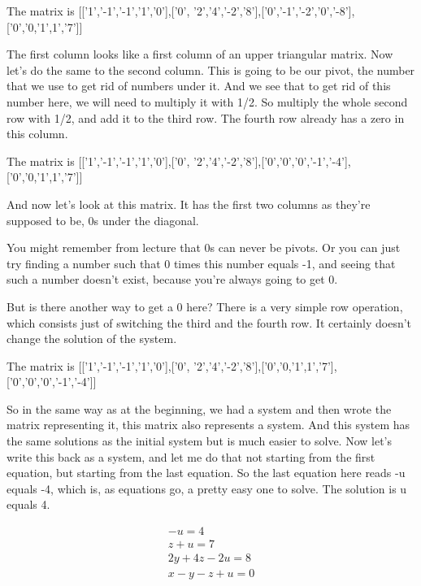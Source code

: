 \documentclass{ximera}
\begin{document}
\begin{question}
\begin{solution}
\begin{hint}
\begin{matrixAnswer}[name=M]
      The matrix is  [['1','-1','-1','1','0'],['0', '2','4','-2','8'],['0','-1','-2','0','-8'],['0','0,'1',1','7']]
 \end{matrixAnswer}
\end{hint}
\begin{hint}
The first column looks like a first column of an upper triangular matrix. Now let's do the same to the second column. This is going to be our pivot, the number that we use to get rid of numbers under it. And we see that to get rid of this number here, we will need to multiply it with 1/2. So multiply the whole second row with 1/2, and add it to the third row. The fourth row already has a zero in this column.
\begin{matrixAnswer}[name=M]
      The matrix is  [['1','-1','-1','1','0'],['0', '2','4','-2','8'],['0','0','0','-1','-4'],['0','0,'1',1','7']]
 \end{matrixAnswer}
And now let's look at this matrix. It has the first two columns as they're supposed to be, 0s under the diagonal. 
\end{hint}

\begin{hint}
You might remember from lecture that 0s can never be pivots. Or you can just try finding a number such that 0 times this number equals -1, and seeing that such a number doesn't exist, because you're always going to get 0.

But is there another way to get a 0 here? There is a very simple row operation, which consists just of switching the third and the fourth row. It certainly doesn't change the solution of the system. 
\begin{matrixAnswer}[name=M]
      The matrix is  [['1','-1','-1','1','0'],['0', '2','4','-2','8'],['0','0,'1',1','7'],['0','0','0','-1','-4']]
\end{matrixAnswer}
\end{hint}

\begin{hint}
So in the same way as at the beginning, we had a system and then wrote the matrix representing it, this matrix also represents a system. And this system has the same solutions as the initial system but is much easier to solve. Now let's write this back as a system, and let me do that not starting from the first equation, but starting from the last equation. So the last equation here reads -u equals -4, which is, as equations go, a pretty easy one to solve. The solution is u equals 4.\end{hint}
\begin{align*}
-u  =  4\\
z+u=7\\
2y+4z-2u=8\\
x-y-z+u=0\\
\end{align*}


\end{solution}
\end{question}
\end{document}
